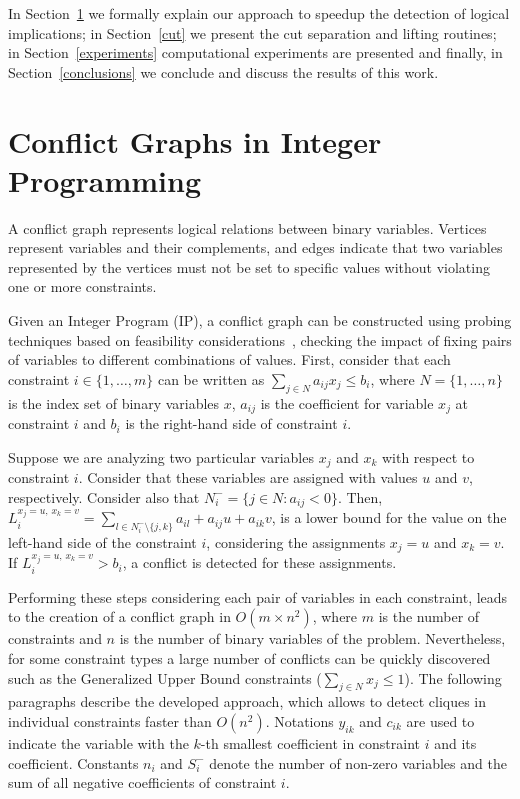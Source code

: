 \documentclass{endm}
\begin{document}
In Section~\ref{seccgraph} we formally explain our approach to speedup the detection of logical implications; in Section~\ref{cut} we present the cut separation and lifting routines; in Section~\ref{experiments} computational experiments are presented and finally, in Section~\ref{conclusions} we conclude and discuss the results of this work.

\section{Conflict Graphs in Integer Programming}\label{seccgraph}

A conflict graph represents logical relations between binary variables. Vertices represent variables and their complements, and edges indicate that two variables represented by the vertices must not be set to specific values without violating one or more constraints.

Given an Integer Program (IP), a conflict graph can be constructed using probing techniques based on feasibility considerations~\cite{atamturk}, checking the impact of fixing pairs of variables to different combinations of values. First, consider that each constraint $i \in \{1,\ldots,m\}$ can be written as $\displaystyle \sum_{j \in N} a_{ij}x_{j} \leq b_{i}$, where $N=\{1,\ldots,n\}$ is the index set of binary variables $x$, $a_{ij}$ is the coefficient for variable $x_{j}$ at constraint $i$ and $b_{i}$ is the right-hand side of constraint $i$.

Suppose we are analyzing two particular variables $x_j$ and $x_k$ with respect to constraint $i$. Consider that these variables are assigned with values $u$ and $v$, respectively. Consider also that $N_{i}^{-} = \{j \in N : a_{ij} < 0\}$. Then, $\displaystyle
L_{i}^{x_j = u,\, x_k = v}=\sum_{l\in N_{i}^{-} \setminus \{j, k\}}a_{il}+a_{ij}u+a_{ik}v $, is a lower bound for the value on the left-hand side of the constraint $i$, considering the assignments $x_j =u$ and $x_k=v$. If $L_{i}^{x_j = u,\, x_k = v} > b_{i}$, a conflict is detected for these assignments. 

Performing these steps considering each pair of variables in each constraint, leads to the creation of a conflict graph in $O(m \times n^2)$, where $m$ is the number of constraints and $n$ is the number of binary variables of the problem. Nevertheless, for some constraint types a large number of conflicts can be quickly discovered such as the Generalized Upper Bound constraints ($\displaystyle \sum_{j\in N}x_j \leq 1$). The following paragraphs describe the developed approach, which allows to detect cliques in individual constraints faster than $O(n^2)$. Notations $y_{ik}$ and $c_{ik}$ are used to indicate the variable with the $k$-th smallest coefficient in constraint $i$ and its coefficient. Constants $n_i$ and $S_i^-$ denote the number of non-zero variables and the sum of all negative coefficients of constraint $i$.
\end{document}
